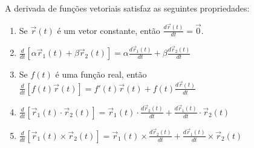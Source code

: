 \begin{teo} A derivada de funções vetoriais satisfaz as seguintes propriedades:
\begin{enumerate}
\item Se $\vec{r}(t)$ é um vetor constante, então $\frac{d\vec{r}(t)}{dt}=\vec{0}$.
\item $\frac{d}{dt}\left[\alpha \vec{r}_1(t)+\beta \vec{r}_2(t)\right]=\alpha\frac{d\vec{r}_1(t)}{dt}+\beta\frac{d\vec{r}_2(t)}{dt}$
\item Se $f(t)$ é uma função real, então $\frac{d}{dt}\left[f(t) \vec{r}(t)\right]=f'(t)\vec{r}(t)+f(t)\frac{d\vec{r}(t)}{dt}$
\item $\frac{d}{dt}\left[\vec{r}_1(t)\cdot \vec{r}_2(t)\right]=\vec{r}_1(t)\cdot\frac{d\vec{r}_2(t)}{dt}+\frac{d\vec{r}_1(t)}{dt}\cdot\vec{r}_2(t)$
\item $\frac{d}{dt}\left[\vec{r}_1(t)\times \vec{r}_2(t)\right]=\vec{r}_1(t)\times\frac{d\vec{r}_2(t)}{dt}+\frac{d\vec{r}_1(t)}{dt}\times\vec{r}_2(t)$
\end{enumerate}
\end{teo}
